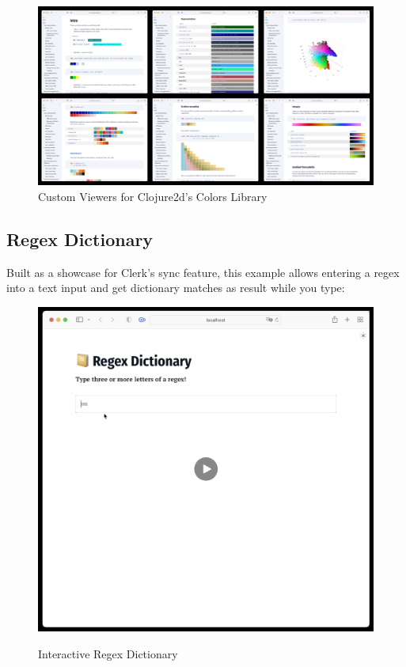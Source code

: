 \documentclass[sigconf,screen]{acmart}
\begin{document}
\begin{figure}
\hypertarget{custom-viewers-for-clojure2ds-colors-library}{%
\centering
\includegraphics{images/custom-viewers-for-clojure2ds-colors-library.png}
\caption{Custom Viewers for Clojure2d's Colors Library}\label{custom-viewers-for-clojure2ds-colors-library}
}
\end{figure}

\hypertarget{regex-dictionary}{%
\subsection{Regex Dictionary}\label{regex-dictionary}}

Built as a showcase for Clerk's sync feature, this example allows entering a regex into a text input and get dictionary matches as result while you type:

\begin{figure}
\hypertarget{interactive-regex-dictionary}{%
\centering
\href{https://cdn.nextjournal.com/data/QmTwZWw4FQT6snxT8RkKt5P7Vxdt2BjM6ofbjKYEcvAZiq?content-type=video/mp4}{\includegraphics{images/interactive-regex-dictionary.png}}
\caption{Interactive Regex Dictionary}\label{interactive-regex-dictionary}
}
\end{figure}
\end{document}
